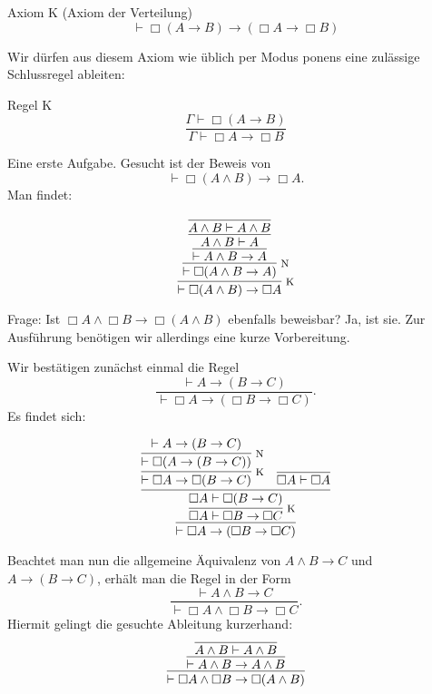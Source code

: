 \documentclass[8pt]{beamer}
\newcommand{\infernote}[1]{\!\text{\footnotesize #1}}
\newcommand{\cond}{\rightarrow}
\newcommand{\lnec}{\Box}
\begin{document}
\begin{frame}
\begin{block}{Axiom K (Axiom der Verteilung)}
\[\vdash \lnec (A\cond B) \cond (\lnec A\cond\lnec B)\]
\end{block}\pause
Wir dürfen aus diesem Axiom wie üblich per Modus ponens
eine zulässige Schlussregel ableiten:
\begin{block}{Regel K}
\[\dfrac{\Gamma\vdash \lnec (A\cond B)}{\Gamma\vdash\lnec A\cond\lnec B}\]
\end{block}
\end{frame}

\begin{frame}
Eine erste Aufgabe. Gesucht ist der Beweis von
\[\vdash \lnec (A\land B)\cond\lnec A.\]
Man findet:\pause

\[
\infer[\infernote{K}]{\vdash \lnec (A\land B)\cond\lnec A}{
  \infer[\infernote{N}]{\vdash\lnec (A\land B\cond A)}{
    \infer{\vdash A\land B\cond A}{
      \infer{A\land B\vdash A}{
        \infer{A\land B\vdash A\land B}{}}}}}
\]\pause

Frage: Ist $\lnec A\land\lnec B\cond\lnec (A\land B)$
ebenfalls beweisbar?\pause{} Ja, ist sie. Zur Ausführung benötigen wir
allerdings eine kurze Vorbereitung.
\end{frame}

\begin{frame}
Wir bestätigen zunächst einmal die Regel
\[\dfrac{\vdash A\cond (B\cond C)}{\vdash\lnec A\cond (\lnec B\cond\lnec C)}.\]
Es findet sich:\pause

\[
\infer{\vdash\lnec A\cond (\lnec B\cond\lnec C)}{
  \infer[\infernote{K}]{\lnec A\vdash\lnec B\cond\lnec C}{
    \infer{\lnec A\vdash\lnec (B\cond C)}{
      \infer[\infernote{K}]{\vdash\lnec A\cond\lnec (B\cond C)}{
        \infer[\infernote{N}]{\vdash\lnec (A\cond (B\cond C))}{
          \vdash A\cond (B\cond C)}}
    & \infer{\lnec A\vdash\lnec A}{}}}}
\]
\end{frame}

\begin{frame}
Beachtet man nun die allgemeine Äquivalenz von $A\land B\cond C$
und $A\cond (B\cond C)$, erhält man die Regel in der Form
\[\dfrac{\vdash A\land B\cond C}{\vdash\lnec A\land\lnec B\cond\lnec C}.\]
Hiermit gelingt die gesuchte Ableitung kurzerhand:\pause
\[
\infer{\vdash\lnec A\land\lnec B\cond\lnec (A\land B)}{
  \infer{\vdash A\land B\cond A\land B}{
    \infer{A\land B\vdash A\land B}{}}}
\]
\end{frame}
\end{document}
